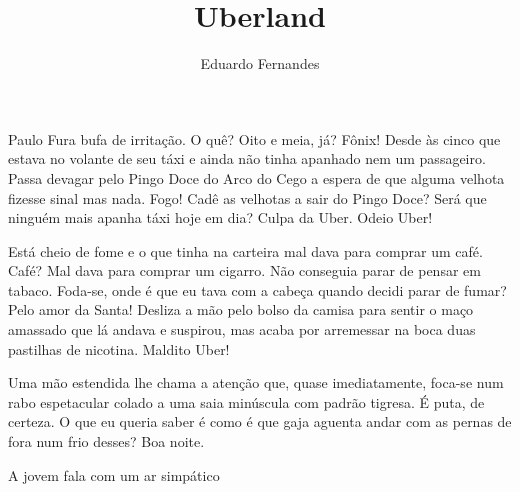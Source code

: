 \documentclass[12pt]{creativeWriting}
\title{Uberland}
\author{Eduardo Fernandes}
\begin{document}
\maketitle

Paulo Fura bufa de irritação. O quê? Oito e meia, já? Fônix! Desde às cinco que estava no volante de seu táxi e ainda não tinha apanhado nem um passageiro. Passa devagar pelo Pingo Doce do Arco do Cego a espera de que alguma velhota fizesse sinal mas nada. Fogo! Cadê as velhotas a sair do Pingo Doce? Será que ninguém mais apanha táxi hoje em dia? Culpa da Uber. Odeio Uber!

Está cheio de fome e o que tinha na carteira mal dava para comprar um café. Café? Mal dava para comprar um cigarro. Não conseguia parar de pensar em tabaco. Foda-se, onde é que eu tava com a cabeça quando decidi parar de fumar? Pelo amor da Santa! Desliza a mão pelo bolso da camisa para sentir o maço amassado que lá andava e suspirou, mas acaba por arremessar na boca duas pastilhas de nicotina. Maldito Uber!

Uma mão estendida lhe chama a atenção que, quase imediatamente, foca-se num rabo espetacular colado a uma saia minúscula com padrão tigresa. É puta, de certeza. O que eu queria saber é como é que gaja aguenta andar com as pernas de fora num frio desses? Boa noite.

 A jovem fala com um ar simpático 











\end{document}
